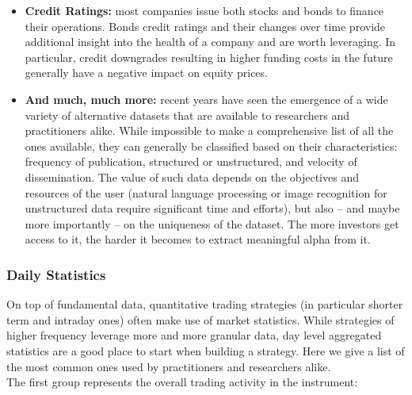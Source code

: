 \begin{itemize}
\item \textbf{Credit Ratings:} most companies issue both stocks and bonds to finance their operations. Bonds credit ratings and their changes over time provide additional insight into the health of a company and are worth leveraging. In particular, credit downgrades resulting in higher funding costs in the future generally have a negative impact on equity prices.

\item \textbf{And much, much more:} recent years have seen the emergence of a wide variety of alternative datasets that are available to researchers and practitioners alike.  
While impossible to make a comprehensive list of all the ones available, they can generally be classified based on their characteristics: frequency of publication, structured or unstructured, and velocity of dissemination. The value of such data depends on the objectives and resources of the user (natural language processing or image recognition for unstructured data require significant time and efforts), but also -- and maybe more importantly -- on the uniqueness of the dataset. The more investors get access to it, the harder it becomes to extract meaningful alpha from it.
\end{itemize}


\subsubsection{Daily Statistics}


On top of fundamental data, quantitative trading strategies (in particular shorter term and intraday ones) often make use of market statistics. While strategies of higher frequency leverage more and more granular data, day level aggregated statistics are a good place to start when building a strategy. Here we give a list of the most common ones used by practitioners and researchers alike. \\

The first group represents the overall trading activity in the instrument: 

